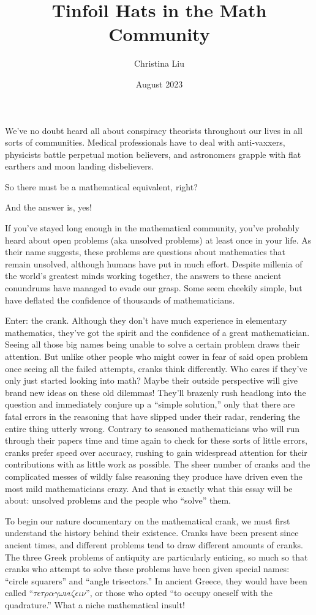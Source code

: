 \documentclass{article}
\title{\textbf{Tinfoil Hats in the Math Community}}
\author{Christina Liu}
\date{August 2023}
\begin{document}
\maketitle

We’ve no doubt heard all about conspiracy theorists throughout our lives in all sorts of communities. Medical professionals have to deal with anti-vaxxers, physicists battle perpetual motion believers, and astronomers grapple with flat earthers and moon landing disbelievers.

So there must be a mathematical equivalent, right?

And the answer is, yes!

If you’ve stayed long enough in the mathematical community, you’ve probably heard about open problems (aka unsolved problems) at least once in your life. As their name suggests, these problems are questions about mathematics that remain unsolved, although humans have put in much effort. Despite millenia of the world’s greatest minds working together, the answers to these ancient conundrums have managed to evade our grasp. Some seem cheekily simple, but have deflated the confidence of thousands of mathematicians.

Enter: the crank. Although they don’t have much experience in elementary mathematics, they’ve got the spirit and the confidence of a great mathematician. Seeing all those big names being unable to solve a certain problem draws their attention. But unlike other people who might cower in fear of said open problem once seeing all the failed attempts, cranks think differently. Who cares if they’ve only just started looking into math? Maybe their outside perspective will give brand new ideas on these old dilemmas! They’ll brazenly rush headlong into the question and immediately conjure up a ``simple solution,'' only that there are fatal errors in the reasoning that have slipped under their radar, rendering the entire thing utterly wrong. Contrary to seasoned mathematicians who will run through their papers time and time again to check for these sorts of little errors, cranks prefer speed over accuracy, rushing to gain widespread attention for their contributions with as little work as possible. The sheer number of cranks and the complicated messes of wildly false reasoning they produce have driven even the most mild mathematicians crazy.
And that is exactly what this essay will be about: unsolved problems and the people who ``solve'' them.

To begin our nature documentary on the mathematical crank, we must first understand the history behind their existence. Cranks have been present since ancient times, and different problems tend to draw different amounts of cranks. The three Greek problems of antiquity are particularly enticing, so much so that cranks who attempt to solve these problems have been given special names: ``circle squarers'' and ``angle trisectors.'' In ancient Greece, they would have been called ``$\tau\epsilon\tau\rho\alpha\gamma\omega\nu\iota\zeta\epsilon\iota\nu$'', or those who opted ``to occupy oneself with the quadrature.'' What a niche mathematical insult!
\end{document}
